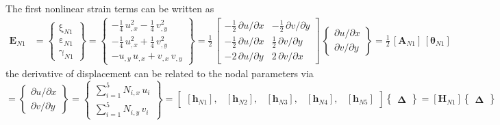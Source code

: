 The first nonlinear strain terms can be written as 
\begin{equation}
\begin{aligned}
\mathbf{E}_{N1} & =  \begin{Bmatrix}
\mathrm \xi_{N1} \\
\mathrm \varepsilon_{N1} \\
\mathrm \gamma_{N1} \end{Bmatrix} =
\begin{Bmatrix}
-\tfrac{1}{4} \, u_{,x}^2 -   \tfrac{1}{4} \, v_{,y}^2 \\
-\tfrac{1}{4} \, u_{,x}^2 + \tfrac{1}{4} \, v_{,y}^2 \\
-u_{,y} \, u_{,x} + v_{,x} \, v_{,y} \end{Bmatrix} = \frac{1}{2} \, \begin{bmatrix}
-\tfrac{1}{2} \, \partial u / \partial x &  - \tfrac{1}{2} \, \partial v / \partial y \\
-\tfrac{1}{2} \, \partial u / \partial x &  \tfrac{1}{2} \, \partial v / \partial y \\
-2 \, \partial u / \partial y  & 2 \, \partial v / \partial x  \end{bmatrix} \, \begin{Bmatrix}
\partial u / \partial x\\
\partial v / \partial y
\end{Bmatrix}
= \tfrac{1}{2} \, [\mathbf{A}_{N1}] \, [\boldsymbol{\theta}_{N1}]
\end{aligned}
\end{equation}
the derivative of displacement can be related to the nodal parameters via
\begin{equation}
[\boldsymbol{\theta}_{N1}] =  \begin{Bmatrix}
\partial u / \partial x\\
\partial v / \partial y
\end{Bmatrix}
= \begin{Bmatrix}
\sum\nolimits_{i=1}^5 N_{i,x} \, u_i\\
\sum\nolimits_{i=1}^5 N_{i,y} \, v_i
\end{Bmatrix} 
= \begin{bmatrix}
[\mathbf{h}_{N1}], & [\mathbf{h}_{N2}], & [\mathbf{h}_{N3}], & [\mathbf{h}_{N4}], & [\mathbf{h}_{N5}] 
\end{bmatrix}  \begin{Bmatrix} \boldsymbol{\Delta} \end{Bmatrix}  
= [\mathbf{H}_{N1}] \begin{Bmatrix} \boldsymbol{\Delta} \end{Bmatrix} 
\end{equation}
